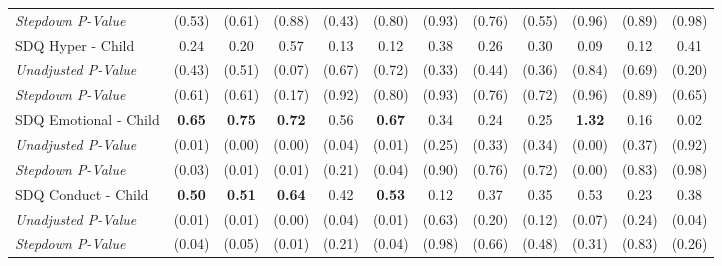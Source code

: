 \begin{tabular}{l c c c c c c c c c c c}
\quad \textit{Stepdown P-Value} & (0.53) & (0.61) & (0.88) & (0.43) & (0.80) & (0.93) & (0.76) & (0.55) & (0.96) & (0.89) & (0.98) \\
SDQ Hyper - Child & 0.24 & 0.20 & 0.57 & 0.13 & 0.12 & 0.38 & 0.26 & 0.30 & 0.09 & 0.12 & 0.41 \\
\quad \textit{Unadjusted P-Value} & (0.43) & (0.51) & (0.07) & (0.67) & (0.72) & (0.33) & (0.44) & (0.36) & (0.84) & (0.69) & (0.20) \\
\quad \textit{Stepdown P-Value} & (0.61) & (0.61) & (0.17) & (0.92) & (0.80) & (0.93) & (0.76) & (0.72) & (0.96) & (0.89) & (0.65) \\
SDQ Emotional - Child & \textbf{ 0.65 } & \textbf{ 0.75 } & \textbf{ 0.72 } & 0.56 & \textbf{ 0.67 } & 0.34 & 0.24 & 0.25 & \textbf{ 1.32 } & 0.16 & 0.02 \\
\quad \textit{Unadjusted P-Value} & (0.01) & (0.00) & (0.00) & (0.04) & (0.01) & (0.25) & (0.33) & (0.34) & (0.00) & (0.37) & (0.92) \\
\quad \textit{Stepdown P-Value} & (0.03) & (0.01) & (0.01) & (0.21) & (0.04) & (0.90) & (0.76) & (0.72) & (0.00) & (0.83) & (0.98) \\
SDQ Conduct - Child & \textbf{ 0.50 } & \textbf{ 0.51 } & \textbf{ 0.64 } & 0.42 & \textbf{ 0.53 } & 0.12 & 0.37 & 0.35 & 0.53 & 0.23 & 0.38 \\
\quad \textit{Unadjusted P-Value} & (0.01) & (0.01) & (0.00) & (0.04) & (0.01) & (0.63) & (0.20) & (0.12) & (0.07) & (0.24) & (0.04) \\
\quad \textit{Stepdown P-Value} & (0.04) & (0.05) & (0.01) & (0.21) & (0.04) & (0.98) & (0.66) & (0.48) & (0.31) & (0.83) & (0.26) \\
\bottomrule
\end{tabular}
